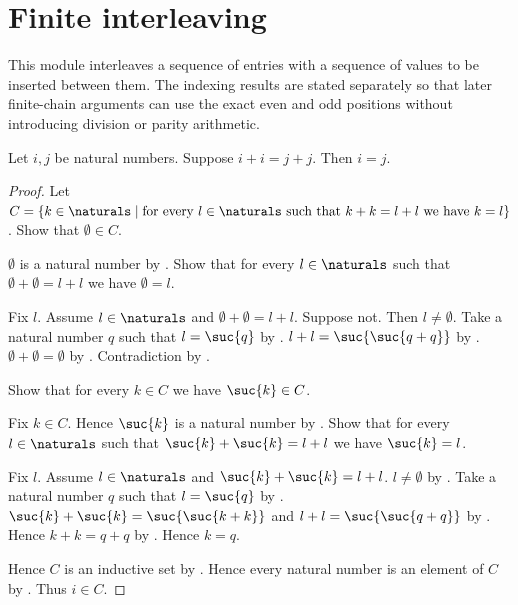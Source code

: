 \section{Finite interleaving}



This module interleaves a sequence of entries with a sequence of values to be
inserted between them.  The indexing results are stated separately so that
later finite-chain arguments can use the exact even and odd positions without
introducing division or parity arithmetic.

\begin{lemma}\label{natural_double_injective}
    Let $i,j$ be natural numbers.
    Suppose $i+i=j+j$.
    Then $i=j$.
\end{lemma}
\begin{proof}
    Let $C=\{k\in\naturals\mid
        \text{for every $l\in\naturals$ such that $k+k=l+l$
        we have $k=l$}\}$.
    Show that $\emptyset\in C$.
    \begin{subproof}
        $\emptyset$ is a natural number by .
        Show that for every $l\in\naturals$ such that
            $\emptyset+\emptyset=l+l$ we have $\emptyset=l$.
        \begin{subproof}
            Fix $l$.
            Assume $l\in\naturals$ and $\emptyset+\emptyset=l+l$.
            Suppose not.
            Then $l\neq\emptyset$.
            Take a natural number $q$ such that $l=\suc{q}$
                by .
            $l+l=\suc{\suc{q+q}}$
                by .
            $\emptyset+\emptyset=\emptyset$
                by .
            Contradiction by .
        \end{subproof}
    \end{subproof}
    Show that for every $k\in C$ we have $\suc{k}\in C$.
    \begin{subproof}
        Fix $k\in C$.
        Hence $\suc{k}$ is a natural number by .
        Show that for every $l\in\naturals$ such that
            $\suc{k}+\suc{k}=l+l$ we have $\suc{k}=l$.
        \begin{subproof}
            Fix $l$.
            Assume $l\in\naturals$ and $\suc{k}+\suc{k}=l+l$.
            $l\neq\emptyset$
                by .
            Take a natural number $q$ such that $l=\suc{q}$
                by .
            $\suc{k}+\suc{k}=\suc{\suc{k+k}}$ and
                $l+l=\suc{\suc{q+q}}$
                by .
            Hence $k+k=q+q$ by .
            Hence $k=q$.
        \end{subproof}
    \end{subproof}
    Hence $C$ is an inductive set by .
    Hence every natural number is an element of $C$
        by .
    Thus $i\in C$.
\end{proof}

